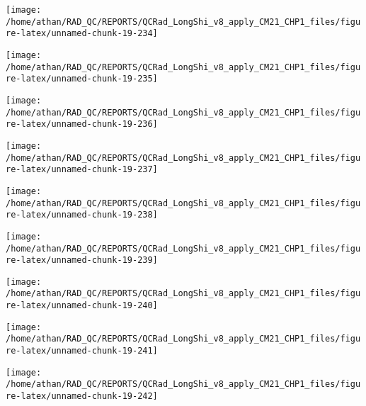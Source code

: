 \documentclass[
  10pt,
  a4paper,oneside]{article}
\begin{document}
\begin{center}\texttt{[image: /home/athan/RAD\_QC/REPORTS/QCRad\_LongShi\_v8\_apply\_CM21\_CHP1\_files/figure-latex/unnamed-chunk-19-234]} \end{center}

\begin{center}\texttt{[image: /home/athan/RAD\_QC/REPORTS/QCRad\_LongShi\_v8\_apply\_CM21\_CHP1\_files/figure-latex/unnamed-chunk-19-235]} \end{center}

\begin{center}\texttt{[image: /home/athan/RAD\_QC/REPORTS/QCRad\_LongShi\_v8\_apply\_CM21\_CHP1\_files/figure-latex/unnamed-chunk-19-236]} \end{center}

\begin{center}\texttt{[image: /home/athan/RAD\_QC/REPORTS/QCRad\_LongShi\_v8\_apply\_CM21\_CHP1\_files/figure-latex/unnamed-chunk-19-237]} \end{center}

\begin{center}\texttt{[image: /home/athan/RAD\_QC/REPORTS/QCRad\_LongShi\_v8\_apply\_CM21\_CHP1\_files/figure-latex/unnamed-chunk-19-238]} \end{center}

\begin{center}\texttt{[image: /home/athan/RAD\_QC/REPORTS/QCRad\_LongShi\_v8\_apply\_CM21\_CHP1\_files/figure-latex/unnamed-chunk-19-239]} \end{center}

\begin{center}\texttt{[image: /home/athan/RAD\_QC/REPORTS/QCRad\_LongShi\_v8\_apply\_CM21\_CHP1\_files/figure-latex/unnamed-chunk-19-240]} \end{center}

\begin{center}\texttt{[image: /home/athan/RAD\_QC/REPORTS/QCRad\_LongShi\_v8\_apply\_CM21\_CHP1\_files/figure-latex/unnamed-chunk-19-241]} \end{center}

\begin{center}\texttt{[image: /home/athan/RAD\_QC/REPORTS/QCRad\_LongShi\_v8\_apply\_CM21\_CHP1\_files/figure-latex/unnamed-chunk-19-242]} \end{center}
\end{document}
